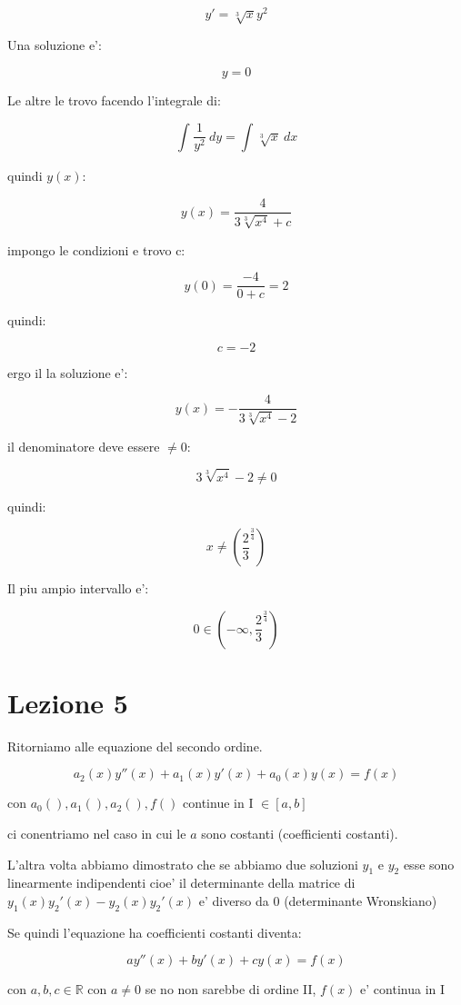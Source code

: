 \documentclass[11pt]{article}
\begin{document}
\[
    y'=\sqrt[3]{x}y^{2}
\]

Una soluzione e':

\[
    y=0
\]

Le altre le trovo facendo l'integrale di:

\[
    \int_{}^{} { \frac{1}{y^{2}}} \: dy = \int_{}^{} {\sqrt[3]{x}} \: dx  
\]

quindi $y(x)$:

\[
    y(x)  = \frac{4}{3 \sqrt[3]{x^{4}}+c}
\]

impongo le condizioni e trovo c:

\[
    y(0) = \frac{-4}{0+c} = 2
\]

quindi:

\[
    c = -2
\]

ergo il la soluzione e':

\[
    y(x) = -\frac{4}{3 \sqrt[3]{x^{4}} - 2}
\]

il denominatore deve essere $\neq 0$:

\[
3 \sqrt[3]{x^{4}} - 2 \neq 0
\]

quindi:

\[
    x \neq (\frac{2}{3}^{ \frac{3}{4}})
\]

Il piu ampio intervallo e':

\[
    0 \in (-\infty, \frac{2}{3}^{ \frac{3}{4}}) 
\]

\newpage

\section{Lezione 5}

Ritorniamo alle equazione del secondo ordine.

\[
    a_2(x)y''(x) + a_1(x) y'(x) + a_0(x) y(x) = f(x)
\]

con $a_0(),a_1(),a_2(),f()$ continue in I $ \in  [a,b]$

ci conentriamo nel caso in cui le $a$ sono costanti (coefficienti costanti).

L'altra volta abbiamo dimostrato che se abbiamo due soluzioni $y_1$ e $y_2$ esse sono linearmente indipendenti cioe' il determinante della matrice di $y_1(x)y_2'(x)-y_2(x)y_2'(x)$ e' diverso da 0 (determinante Wronskiano)

Se quindi l'equazione ha coefficienti costanti diventa:

\[
    ay''(x)+by'(x)+cy(x) = f(x)
\]

con $a,b,c \in \mathbb{R}$ con $a \neq 0$ se no non sarebbe di ordine II, $f(x)$ e' continua in I
\end{document}
